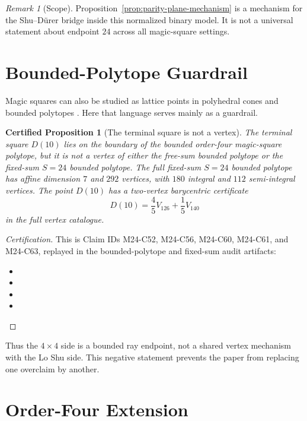 \documentclass[11pt,a4paper]{article}
\newtheorem{certprop}[theorem]{Certified Proposition}
\theoremstyle{definition}
\theoremstyle{remark}
\newtheorem{remark}[theorem]{Remark}
\newcommand{\Durer}{D\"urer\xspace}
\begin{document}
\begin{remark}[Scope]
Proposition~\ref{prop:parity-plane-mechanism} is a mechanism for the
Shu--\Durer bridge inside this normalized binary model.  It is not a universal
statement about endpoint \(24\) across all magic-square settings.
\end{remark}

\section{Bounded-Polytope Guardrail}
\label{sec:polytope}

Magic squares can also be studied as lattice points in polyhedral cones and
bounded polytopes
\cite{wardMagicVectorSpaces,ahmedMagicSquares,ahmedDeLoeraHemmecke}.  Here
that language serves mainly as a guardrail.

\begin{certprop}[The terminal square is not a vertex]
\label{prop:not-vertex}
The terminal square \(D(10)\) lies on the boundary of the bounded order-four
magic-square polytope, but it is not a vertex of either the free-sum bounded
polytope or the fixed-sum \(S=24\) bounded polytope.  The full fixed-sum
\(S=24\) bounded polytope has affine dimension \(7\) and \(292\) vertices,
with \(180\) integral and \(112\) semi-integral vertices.  The point \(D(10)\)
has a two-vertex barycentric certificate
\[
D(10)=\frac45 V_{126}+\frac15 V_{140}
\]
in the full vertex catalogue.
\end{certprop}

\begin{proof}[Certification]
This is Claim IDs M24-C52, M24-C56, M24-C60, M24-C61, and M24-C63, replayed
in the bounded-polytope and fixed-sum audit artifacts:
\begin{itemize}[leftmargin=*]
\item {}
\item {}
\item {}
\item {}
\end{itemize}
\end{proof}

Thus the \(4\times4\) side is a bounded ray endpoint, not a shared vertex
mechanism with the Lo Shu side.  This negative statement prevents the paper
from replacing one overclaim by another.

\section{Order-Four Extension}
\label{sec:order4}
\end{document}
